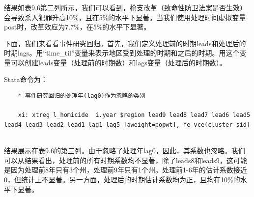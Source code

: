 \documentclass[cn,12pt,math=newtx,citestyle=gb7714-2015,bibstyle=gb7714-2015]{elegantbook}
\begin{document}
结果如表9.6第二列所示，我们可以看到，枪支改革（致命性防卫法案是否生效）会导致杀人犯罪升高10\%，且在5\%的水平下显著。当我们使用处理时间虚拟变量post时，改革效应为7.7\%，在5\%的水平下显著。

下面，我们来看看事件研究回归。首先，我们定义处理前的时期leads和处理后的时期lags。用“time\_til”变量来表示地区受到处理的时期和之后的时期。用这个变量可以创建leads变量（处理前的时期数）和lags变量（处理后的时期数）。

Stata命令为：

\begin{lstlisting}
	* 事件研究回归的处理年(lag0)作为忽略的类别
	
	xi: xtreg l_homicide  i.year $region lead9 lead8 lead7 lead6 lead5 lead4 lead3 lead2 lead1 lag1-lag5 [aweight=popwt], fe vce(cluster sid)
	
\end{lstlisting}

结果展示在表9.6的第三列。由于忽略了处理年lag0，因此，其系数也忽略。我们可以从结果看出，处理前的所有时期系数均不显著，除了leads8和leads9，这可能是因为处理前8年只有3个州，处理前9年只有1个州。处理前1-6年的估计系数接近0，但统计上不显著。另一方面，处理后的时期估计系数均为正，且均在10\%的水平下显著。
\end{document}
